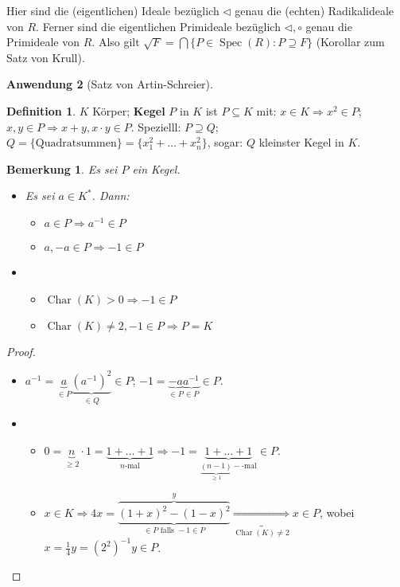 \documentclass[headsepline=true,DIV=11]{scrartcl}
\newtheorem*{remark}{Bemerkung}
\theoremstyle{definition}
\newtheorem*{definition}{Definition}
\newcommand{\Char}{\operatorname{Char}}
\newcommand{\Spec}{\operatorname{Spec}}
\begin{document}
Hier sind die (eigentlichen) Ideale bezüglich $\lhd$ genau die (echten) Radikalideale von $R$. Ferner sind die eigentlichen Primideale bezüglich
$\lhd,\circ$ genau die Primideale von $R$. Also gilt $\sqrt{F}=\bigcap\{P\in\Spec(R):P\supseteq F\}$ (Korollar zum Satz von Krull).


{\bf Anwendung 2} (Satz von Artin-Schreier).

\begin{definition}
  $K$ Körper; {\bf Kegel} $P$ in $K$ ist $P\subseteq K$ mit: $x\in K\Rightarrow x^2\in P$; $x,y\in P\Rightarrow x+y, x\cdot y \in P$. Spezielll:
  $P\supseteq Q$; $Q=\{\mbox{Quadratsummen}\}=\{x_1^2+\ldots+x_n^2\}$, sogar: $Q$ kleinster Kegel in $K$.
\end{definition}

\begin{remark}
  Es sei $P$ ein Kegel.
  \begin{itemize}
  \item[a.] Es sei $a\in K^*$. Dann:
    \begin{itemize}
    \item $a\in P \Rightarrow a^{-1}\in P$
    \item $a,-a\in P\Rightarrow -1\in P$
    \end{itemize}
  \item[b.]
    \begin{itemize}
    \item $\Char(K)>0 \Rightarrow -1\in P$
    \item $\Char(K)\neq 2, -1\in P \Rightarrow P=K$
    \end{itemize}
  \end{itemize}
\end{remark}

\begin{proof}
  \begin{itemize}
  \item[a.] $a^{-1}=\underbrace{a}_{\in P}\underbrace{(a^{-1})^2}_{\in Q}\in P$; $-1=\underbrace{-a}_{\in P}\underbrace{a^{-1}}_{\in P}\in P$.
  \item[b.]
    \begin{itemize}
    \item $0 = \underbrace{n}_{\ge 2}\cdot 1=\underbrace{1+\ldots+1}_{n\mbox{-mal}} \Rightarrow -1 = \underbrace{1+\ldots+1}_{\underbrace{(n-1)}_{\ge
        1}-\mbox{-mal}} \in P$.
    \item $x\in K \Rightarrow 4x=\underbrace{\overbrace{(1+x)^2-(1-x)^2}^y}_{\in P\mbox{ falls }-1\in P} \underbrace{\Rightarrow}_{\Char(K)\neq 2}
      x\in P$, wobei $x=\frac{1}{4}y=(2^2)^{-1}y\in P$.
    \end{itemize}
  \end{itemize}
\end{proof}
\end{document}
